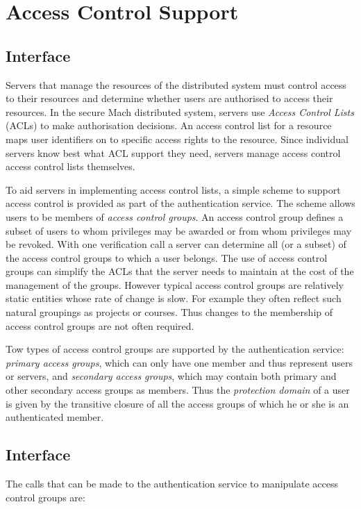 \section{Access Control Support}
\label{author}
\subsection{Interface}
Servers that manage the resources of the distributed system must control
access to their resources and determine whether users are authorised to
access their resources.  In the secure Mach distributed system, servers use
{\em Access Control Lists\/} (ACLs) to make authorisation decisions.  An
access control list for a resource maps user identifiers on to specific
access rights to the resource.  Since individual servers know best what ACL
support they need, servers manage access control access control lists
themselves.

To aid servers in implementing access control lists, a simple scheme to
support access control is provided as part of the authentication service.
The scheme allows users to be members of {\em access control groups}.  An
access control group defines a subset of users to whom privileges may be
awarded or from whom privileges may be revoked.  With one verification call
a server can determine all (or a subset) of the access control groups to
which a user belongs.  The use of access control groups can simplify the
ACLs that the server needs to maintain at the cost of the management of the
groups.  However typical access control groups are relatively static
entities whose rate of change is slow.  For example they often reflect such
natural groupings as projects or courses.  Thus changes to the membership of
access control groups are not often required.

Tow types of access control groups are supported by the authentication
service: {\em primary access groups}, which can only have one member and
thus represent users or servers, and {\em secondary access groups}, which
may contain both primary and other secondary access groups as members.  Thus
the {\em protection domain\/} of a user is given by the transitive closure
of all the access groups of which he or she is an authenticated member.

\subsection{Interface}
The calls that can be made to the authentication service to manipulate
access control groups are:

